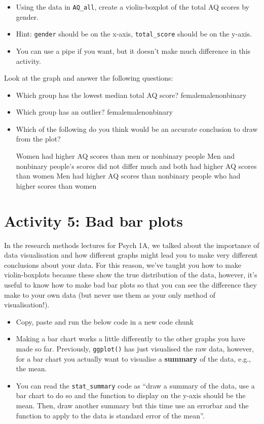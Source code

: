 \documentclass[
  oneside]{book}
\providecommand{\tightlist}{%
  \setlength{\itemsep}{0pt}\setlength{\parskip}{0pt}}
\begin{document}
\begin{itemize}
\tightlist
\item
  Using the data in \texttt{AQ\_all}, create a violin-boxplot of the total AQ scores by gender.
\item
  Hint: \texttt{gender} should be on the x-axis, \texttt{total\_score} should be on the y-axis.
\item
  You can use a pipe if you want, but it doesn't make much difference in this activity.
\end{itemize}

Look at the graph and answer the following questions:

\begin{itemize}
\item
  Which group has the lowest median total AQ score? femalemalenonbinary
\item
  Which group has an outlier? femalemalenonbinary
\item
  Which of the following do you think would be an accurate conclusion to draw from the plot?

  \hypertarget{radio_EVVIXIRPKO}{}
  {Women had higher AQ scores than men or nonbinary people} {Men and nonbinary people's scores did not differ much and both had higher AQ scores than women} {Men had higher AQ scores than nonbinary people who had higher scores than women}
\end{itemize}

\hypertarget{activity-5-bad-bar-plots}{%
\section{Activity 5: Bad bar plots}\label{activity-5-bad-bar-plots}}

In the research methods lectures for Psych 1A, we talked about the importance of data visualisation and how different graphs might lead you to make very different conclusions about your data. For this reason, we've taught you how to make violin-boxplots because these show the true distribution of the data, however, it's useful to know how to make bad bar plots so that you can see the difference they make to your own data (but never use them as your only method of visualisation!).

\begin{itemize}
\tightlist
\item
  Copy, paste and run the below code in a new code chunk
\item
  Making a bar chart works a little differently to the other graphs you have made so far. Previously, \texttt{ggplot()} has just visualised the raw data, however, for a bar chart you actually want to visualise a \textbf{summary} of the data, e.g., the mean.
\item
  You can read the \texttt{stat\_summary} code as ``draw a summary of the data, use a bar chart to do so and the function to display on the y-axis should be the mean. Then, draw another summary but this time use an errorbar and the function to apply to the data is standard error of the mean''.
\end{itemize}
\end{document}
